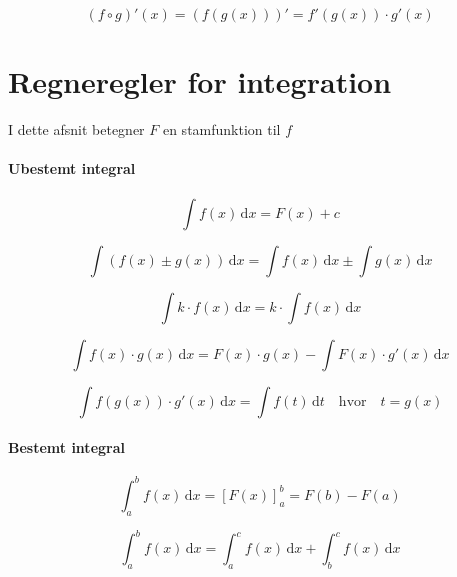 \documentclass[11pt,a4paper,landscape,twocolumn,fleqn,leqno]{article}
\begin{document}
\begin{equation}
\left(f \circ g\right)'(x) = \left(f\left(g(x)\right)\right)' = f'\left(g(x)\right) \cdot g'(x)
\end{equation}

\section{Regneregler for integration}

I dette afsnit betegner $F$ en stamfunktion til $f$

\paragraph{Ubestemt integral}

\begin{equation}
\int f(x)\, \mathrm{d}x = F(x) + c
\end{equation}

\begin{equation}
\int \left(f(x) \pm g(x)\right)\, \mathrm{d}x = \int f(x)\, \mathrm{d}x \pm \int g(x)\, \mathrm{d}x
\end{equation}

\begin{equation}
\int k \cdot f(x)\, \mathrm{d}x = k \cdot \int f(x)\, \mathrm{d}x
\end{equation}

\begin{equation}
\int f(x) \cdot g(x)\, \mathrm{d}x = F(x) \cdot g(x) -  \int F(x) \cdot g'(x)\, \mathrm{d}x
\end{equation}

\begin{equation}
\int f(g(x)) \cdot g'(x)\, \mathrm{d}x = \int f(t)\, \mathrm{d}t \quad \mbox{hvor} \quad t = g(x)
\end{equation}

\paragraph{Bestemt integral}

\begin{equation}
\int_a^b f(x)\, \mathrm{d}x = \left[F(x)\right]_a^b = F(b) - F(a)
\end{equation}

\begin{equation}
\int_a^b f(x)\, \mathrm{d}x = \int_a^c f(x)\, \mathrm{d}x + \int_b^c f(x)\, \mathrm{d}x
\end{equation}
\end{document}
